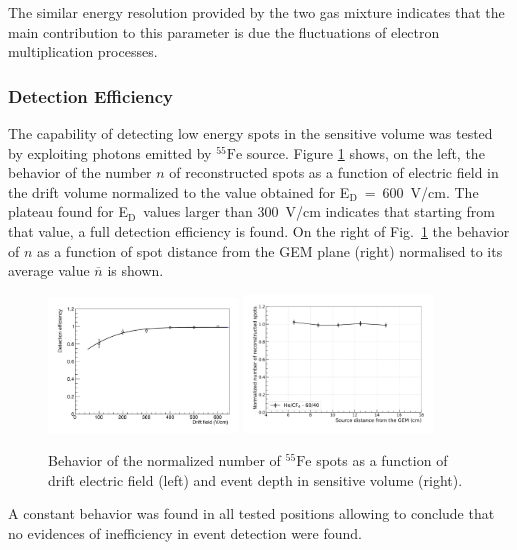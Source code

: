\documentclass[review]{elsarticle}
\newcommand{\fe}{\ensuremath{^{55}\textrm{Fe}}\xspace}
\newcommand{\Ed}  {E$_{\mathrm{D}}$\xspace}
\begin{document}
The similar energy resolution provided by the two gas mixture indicates that the main contribution to this parameter is due the fluctuations of electron multiplication processes.


\subsubsection{Detection Efficiency}

The capability of detecting low energy spots in the sensitive volume was tested by exploiting photons emitted by \fe source.
Figure \ref{fig:deteff} shows, on the left, the behavior of the number $n$ of reconstructed spots as a function of electric field in the drift volume normalized to the value obtained for \Ed~=~600~V/cm.
The plateau found for \Ed\ values larger than 300~V/cm indicates that starting from that value, a full detection efficiency is found. 
On the right of Fig.~\ref{fig:deteff} the behavior of $n$ as a function of spot distance from the GEM plane (right) normalised to its average value $\overline{n}$ is shown.

\begin{figure}[ht]
\centering
\includegraphics[width=0.45\textwidth]{gEff_Edrift.pdf}
\includegraphics[width=0.45\textwidth]{feZscan6040_wo_4.pdf}
\caption{Behavior of the normalized number of \fe spots as a function of drift electric field (left) and event depth in sensitive volume (right).} 
\label{fig:deteff}
\end{figure}

A constant behavior was found in all tested positions allowing to conclude that no evidences of inefficiency in event detection were found.
\end{document}
